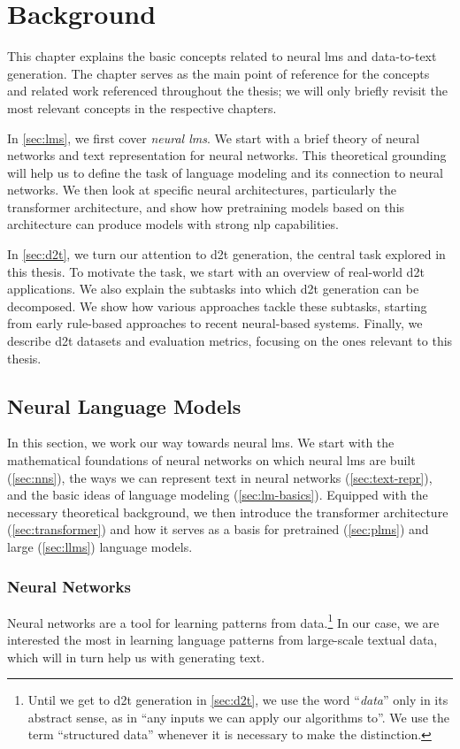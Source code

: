 
\chapter{Background}
\label{chap:background}

This chapter explains the basic concepts related to neural \acp{lm} and data-to-text generation. The chapter serves as the main point of reference for the concepts and related work referenced throughout the thesis; we will only briefly revisit the most relevant concepts in the respective chapters.

In \autoref{sec:lms}, we first cover \emph{neural \acp{lm}}. We start with a brief theory of neural networks and text representation for neural networks. This theoretical grounding will help us to define the task of language modeling and its connection to neural networks. We then look at specific neural architectures, particularly the transformer architecture, and show how pretraining models based on this architecture can produce models with strong \ac{nlp} capabilities.

In \autoref{sec:d2t}, we turn our attention to \ac{d2t} generation, the central task explored in this thesis. To motivate the task, we start with an overview of real-world \ac{d2t} applications. We also explain the subtasks into which \ac{d2t} generation can be decomposed. We show how various approaches tackle these subtasks, starting from early rule-based approaches to recent neural-based systems. Finally, we describe \ac{d2t} datasets and evaluation metrics, focusing on the ones relevant to this thesis.


\section{Neural Language Models}
\label{sec:lms}
In this section, we work our way towards neural \acp{lm}. We start with the mathematical foundations of neural networks on which neural \acp{lm} are built (\autoref{sec:nns}), the ways we can represent text in neural networks (\autoref{sec:text-repr}), and the basic ideas of language modeling (\autoref{sec:lm-basics}). Equipped with the necessary theoretical background, we then introduce the transformer architecture (\autoref{sec:transformer}) and how it serves as a basis for pretrained (\autoref{sec:plms}) and large (\autoref{sec:llms}) language models.

\subsection{Neural Networks}
\label{sec:nns}
Neural networks are a tool for learning patterns from data.\footnote{Until we get to \ac{d2t} generation in \autoref{sec:d2t}, we use the word ``\textit{data}'' only in its abstract sense, as in ``any inputs we can apply our algorithms to''. We use the term ``structured data'' whenever it is necessary to make the distinction.} In our case, we are interested the most in learning language patterns from large-scale textual data, which will in turn help us with generating text.

